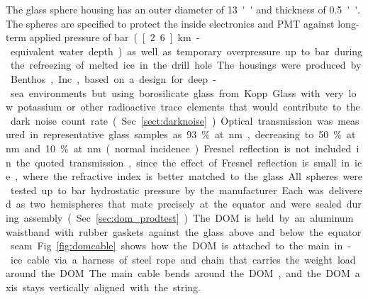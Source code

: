 The glass sphere housing has an outer diameter of \SI{13}{''} and thickness
of \SI{0.5}{''}.
The spheres are specified to protect the inside electronics and PMT against long-term applied pressure of 
\unit[250]bar (\unit[2.6]km-equivalent water depth)
as well as temporary overpressure up to \unit[690]bar during the refreezing of melted ice in the drill hole.
The housings were produced by Benthos, Inc., based on a design for deep-sea
environments but using borosilicate glass from Kopp Glass
with very low potassium or other radioactive trace elements that would contribute to the dark noise
count rate (Sec.~\ref{sect:darknoise}).  
Optical transmission was measured in representative glass samples as 93\% at \unit[400]nm,
decreasing to 50\% at \unit[340]nm and 10\% at \unit[315]nm (normal
incidence). Fresnel reflection is not included in the quoted
transmission, since the effect of Fresnel reflection is small in ice,
where the refractive index is better matched to the glass.


All spheres were tested up to \unit[690]bar hydrostatic pressure by the manufacturer.
Each was delivered as two hemispheres that mate precisely at the equator
and were sealed during assembly (Sec.~\ref{sec:dom_prodtest}).  The DOM
is held by an aluminum waistband with rubber gaskets against 
the glass above and below the equator seam. 
Fig.~\ref{fig:domcable} shows how the DOM is attached to the main in-ice cable via a harness
of steel rope and chain that carries the weight load around the DOM.
The main cable bends around the DOM, and the DOM axis stays vertically aligned with the string.

